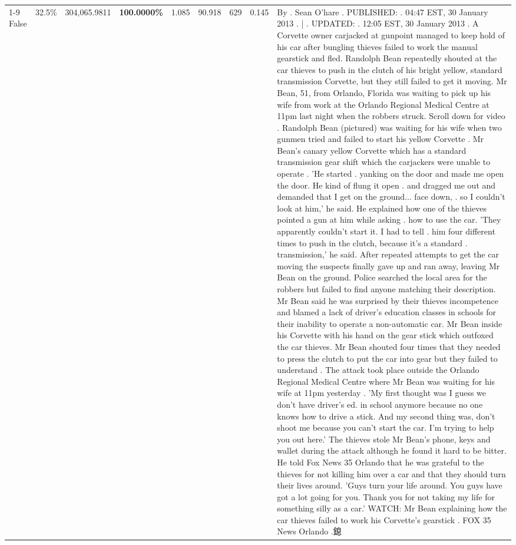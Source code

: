 \begin{table}[H]
\begin{tabular}{lllrlllll}
\cline{1-9} \cline{2-9}
False & 32.5\% & 304,065.9811 & \bfseries \color{red} 100.0000\% & 1.085 & 90.918 & 629 & 0.145 & By . Sean O'hare . PUBLISHED: . 04:47 EST, 30 January 2013 . | . UPDATED: . 12:05 EST, 30 January 2013 . A Corvette owner carjacked at gunpoint managed to keep hold of his car after bungling thieves failed to work the manual gearstick and fled. Randolph Bean repeatedly shouted at the car thieves to push in the clutch of his bright yellow, standard transmission Corvette, but they still failed to get it moving. Mr Bean, 51, from Orlando, Florida was waiting to pick up his wife from work at the Orlando Regional Medical Centre at 11pm last night when the robbers struck. Scroll down for video . Randolph Bean (pictured) was waiting for his wife when two gunmen tried and failed to start his yellow Corvette . Mr Bean's canary yellow Corvette which has a standard transmission gear shift which the carjackers were unable to operate . 'He started . yanking on the door and made me open the door. He kind of flung it open . and dragged me out and demanded that I get on the ground... face down, . so I couldn't look at him,' he said. He explained how one of the thieves pointed a gun at him while asking . how to use the car. 'They apparently couldn't start it. I had to tell . him four different times to push in the clutch, because it's a standard . transmission,' he said. After repeated attempts to get the car moving the suspects finally gave up and ran away, leaving Mr Bean on the ground. Police searched the local area for the robbers but failed to find anyone matching their description. Mr Bean said he was surprised by their thieves incompetence and blamed a lack of driver's education classes in schools for their inability to operate a non-automatic car. Mr Bean inside his Corvette with his hand on the gear stick which outfoxed the car thieves. Mr Bean shouted four times that they needed to press the clutch to put the car into gear but they failed to understand . The attack took place outside the Orlando Regional Medical Centre where Mr Bean was waiting for his wife at 11pm yesterday . 'My first thought was I guess we don't have driver's ed. in school anymore because no one knows how to drive a stick. And my second thing was, don't shoot me because you can't start the car. I'm trying to help you out here.' The thieves stole Mr Bean's phone, keys and wallet during the attack although he found it hard to be bitter. He told Fox News 35 Orlando that he was grateful to the thieves for not killing him over a car and that they should turn their lives around. 'Guys turn your life around. You guys have got a lot going for you. Thank you for not taking my life for something silly as a car.' WATCH: Mr Bean explaining how the car thieves failed to work his Corvette's gearstick . FOX 35 News Orlando .鎴 \\

\end{tabular}
\end{table}
